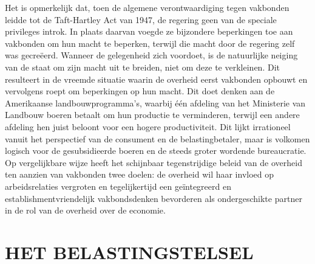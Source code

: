 \documentclass[
  a5paper,
  smalldemyvopaper,10pt,twoside,onecolumn,openright,extrafontsizes,hidelinks]{memoir}
\begin{document}
Het is opmerkelijk dat, toen de algemene verontwaardiging tegen
vakbonden leidde tot de Taft-Hartley Act van 1947, de regering geen van
de speciale privileges introk. In plaats daarvan voegde ze bijzondere
beperkingen toe aan vakbonden om hun macht te beperken, terwijl die
macht door de regering zelf was gecreëerd. Wanneer de gelegenheid zich
voordoet, is de natuurlijke neiging van de staat om zijn macht uit te
breiden, niet om deze te verkleinen. Dit resulteert in de vreemde
situatie waarin de overheid eerst vakbonden opbouwt en vervolgens roept
om beperkingen op hun macht. Dit doet denken aan de Amerikaanse
landbouwprogramma's, waarbij één afdeling van het Ministerie van
Landbouw boeren betaalt om hun productie te verminderen, terwijl een
andere afdeling hen juist beloont voor een hogere productiviteit. Dit
lijkt irrationeel vanuit het perspectief van de consument en de
belastingbetaler, maar is volkomen logisch voor de gesubsidieerde boeren
en de steeds groter wordende bureaucratie. Op vergelijkbare wijze heeft
het schijnbaar tegenstrijdige beleid van de overheid ten aanzien van
vakbonden twee doelen: de overheid wil haar invloed op arbeidsrelaties
vergroten en tegelijkertijd een geïntegreerd en establishmentvriendelijk
vakbondsdenken bevorderen als ondergeschikte partner in de rol van de
overheid over de economie.

\section{HET BELASTINGSTELSEL}\label{het-belastingstelsel}
\end{document}
